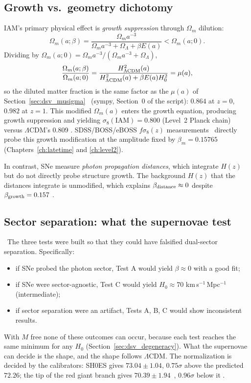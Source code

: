\subsection{Growth vs.\ geometry dichotomy}
IAM's primary physical effect is \emph{growth suppression} through $\Omega_m$ dilution:
\begin{equation}
\Omega_m(a;\beta)=\frac{\Omega_ma^{-3}}{\Omega_ma^{-3}+\Omega_\Lambda+\beta E(a)}<\Omega_m(a;0). \label{eq:dsv_Omdil}
\end{equation}
Dividing by $\Omega_m(a;0)=\Omega_ma^{-3}/(\Omega_ma^{-3}+\Omega_\Lambda)$,
\begin{equation}
\frac{\Omega_m(a;\beta)}{\Omega_m(a;0)}=\frac{H^2_{\Lambda\rm CDM}(a)}{H^2_{\Lambda\rm CDM}(a)+\beta E(a)H_0^2}=\mu(a), \label{eq:dsv_Omdil_mu}
\end{equation}
so the diluted matter fraction is the same factor as the $\mu(a)$ of Section~\ref{sec:dsv_musigma} \derived\ (sympy, Section~0 of the script): $0.864$ at
$z=0$, $0.982$ at $z=1$. This modified $\Omega_m(a)$ enters the growth equation, producing growth suppression and yielding $\sigma_8(\text{IAM})=0.800$
(Level~2 Planck chain) versus $\Lambda$CDM's 0.809 \measured. SDSS/BOSS/eBOSS $f\sigma_8(z)$ measurements~\cite{Howlett2015,Alam2017,Alam2021} directly
probe this growth modification at the amplitude fixed by $\beta_m=0.15765$ (Chapters~\ref{ch:latetime} and \ref{ch:level2}).

In contrast, SNe measure \emph{photon propagation distances}, which integrate $H(z)$ but do not directly probe structure growth. The background $H(z)$
that the distances integrate is unmodified, which explains $\beta_{\rm distance}\approx0$ despite $\beta_{\rm growth}=0.157$ \interp.

\subsection{Sector separation: what the supernovae test}
\interp\ The three tests were built so that they could have falsified dual-sector separation. Specifically:
\begin{itemize}
\item if SNe probed the photon sector, Test A would yield $\beta\approx0$ with a good fit;
\item if SNe were sector-agnostic, Test C would yield $H_0\approx70$ km\,s$^{-1}$\,Mpc$^{-1}$ (intermediate);
\item if sector separation were an artifact, Tests A, B, C would show inconsistent results.
\end{itemize}
With $M$ free none of these outcomes can occur, because each test reaches the same minimum for any $H_0$ (Section~\ref{sec:dsv_degeneracy}). What the
supernovae can decide is the shape, and the shape follows $\Lambda$CDM. The normalization is decided by the calibrators: SH0ES gives $73.04\pm1.04$,
$0.75\sigma$ above the predicted $72.26$; the tip of the red giant branch gives $70.39\pm1.94$~\cite{Freedman2025}, $0.96\sigma$ below it \observed.


